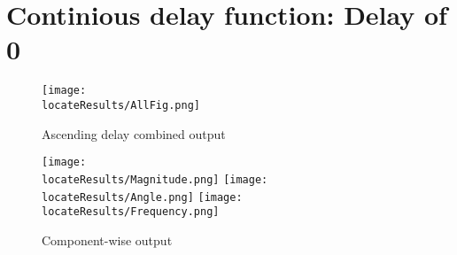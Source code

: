 \newpage
\section{Continious delay function: Delay of 0}
\begin{figure}[hb]
    \texttt{[image: \\locateResults/AllFig.png]}    
    \caption{Ascending delay combined output}
    \label{fig:PMUsim-Cont0-allfig}
\end{figure}


     \begin{figure}
        \caption{Component-wise output}
 
    \texttt{[image: \\locateResults/Magnitude.png]}    
         \label{fig:PMUsim-Cont0Mag}
   \texttt{[image: \\locateResults/Angle.png]}    
         \label{fig:PMUsim-Cont0Ang}
   \texttt{[image: \\locateResults/Frequency.png]}    
         \label{fig:PMUsim-Cont0Freq}
 
\end{figure}


